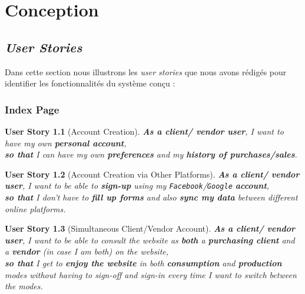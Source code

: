 \documentclass[a4paper,12pt]{book}
\theoremstyle{break}
\newtheorem{userStory}{User Story}
\theoremstyle{break}
\theoremstyle{definition}
\theoremstyle{remark}
\begin{document}
\chapter{Conception}
\section{\textit{User Stories}}
Dans cette section nous illustrons les \textit{user stories} que nous avons rédigés pour identifier les fonctionnalités du système conçu :
\subsection{Index Page}
\begin{userStory}[Account Creation]
\textbf{As a {\color{green} client}/{\color{red} vendor} user}, I want to have my own \textbf{personal account},\\
\indent
\textbf{so that} I can have my own \textbf{preferences} and my \textbf{history of purchases/sales}.
\end{userStory}

\begin{userStory}[Account Creation via Other Platforms]
\textbf{As a {\color{green} client}/{\color{red} vendor} user}, I want to be able to \textbf{sign-up} using my \texttt{Facebook}/\texttt{Google} \textbf{account},\\
\indent
\textbf{so that} I don't have to \textbf{fill up forms} and also \textbf{sync my data} between different online platforms.
\end{userStory}

\begin{userStory}[Simultaneous Client/Vendor Account]
\textbf{As a {\color{green} client}/{\color{red} vendor} user}, I want to be able to consult the website as \textbf{both} a \textbf{purchasing client} and a \textbf{vendor} (in case I am both) on the website,\\
\indent
\textbf{so that} I get to \textbf{enjoy the website} in both \textbf{consumption} and \textbf{production} modes without having to sign-off and sign-in every time I want to switch between the modes.
\end{userStory}
\end{document}
